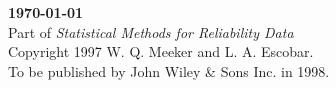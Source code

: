 
{\large {\bf \today}}\\[2ex]
Part of 
{\em Statistical Methods for Reliability Data}\\
Copyright 1997 W. Q. Meeker and L. A. Escobar. \\[1ex]
To be published by John Wiley \& Sons Inc. in 1998.

